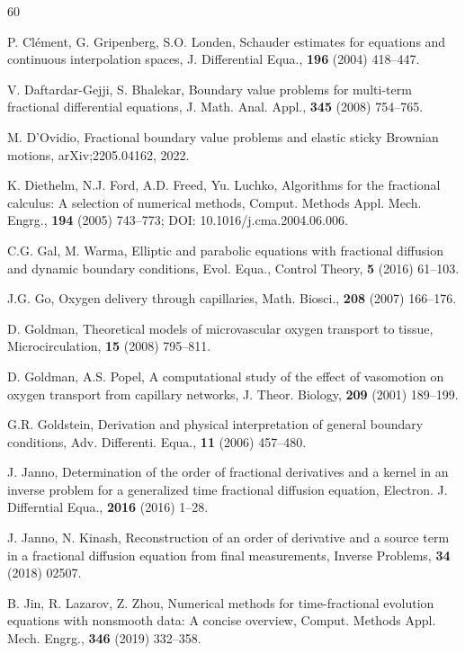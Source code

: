 \documentclass[reqno]{amsart}
\theoremstyle{definition}
\numberwithin{equation}{section}
\begin{document}
\begin{thebibliography}{60}

P. Cl\'{e}ment, G. Gripenberg, S.O. Londen, Schauder estimates for equations and continuous interpolation spaces, J. Differential Equa., \textbf{196} (2004) 418--447.


 V. Daftardar-Gejji, S. Bhalekar, Boundary value problems for multi-term fractional differential equations, J. Math. Anal. Appl., \textbf{345} (2008) 754--765.

M. D'Ovidio, Fractional boundary value problems and elastic sticky Brownian motions, arXiv;2205.04162, 2022.

K. Diethelm, N.J. Ford, A.D. Freed, Yu. Luchko,  Algorithms for the fractional calculus: A selection of numerical methods, Comput. Methods Appl. Mech. Engrg., \textbf{194} (2005) 743--773; DOI: 10.1016/j.cma.2004.06.006.

C.G. Gal, M. Warma, Elliptic and parabolic equations with fractional diffusion and dynamic boundary conditions, Evol. Equa., Control Theory, \textbf{5} (2016) 61--103.


J.G. Go, Oxygen delivery through capillaries, Math. Biosci., \textbf{208} (2007) 166--176.

D. Goldman, Theoretical models of microvascular oxygen transport to tissue, Microcirculation, \textbf{15} (2008)
795--811.

D. Goldman, A.S. Popel, A computational study of the effect of vasomotion on oxygen transport from capillary
networks, J. Theor. Biology, \textbf{209} (2001) 189--199.


G.R. Goldstein, Derivation and physical interpretation of general boundary conditions, Adv. Differenti. Equa., \textbf{11} (2006) 457--480.

J. Janno, Determination of the order of fractional derivatives and a kernel in an inverse problem for a generalized time fractional diffusion equation, Electron. J. Differntial Equa., \textbf{2016} (2016) 1--28.


J. Janno, N. Kinash, Reconstruction of an order of derivative and a source term in a fractional diffusion equation from final measurements,
Inverse Problems, \textbf{34} (2018) 02507.


B. Jin, R. Lazarov, Z. Zhou, Numerical methods for time-fractional evolution equations with nonsmooth data: A concise overview, Comput. Methods Appl. Mech. Engrg., \textbf{346} (2019) 332--358.


\end{thebibliography}
\end{document}
